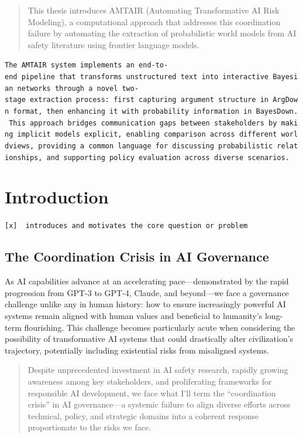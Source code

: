 \documentclass[
  11pt,
  letterpaper,
]{book}
\begin{document}
\begin{quote}
This thesis introduces AMTAIR (Automating Transformative AI Risk
Modeling), a computational approach that addresses this coordination
failure by automating the extraction of probabilistic world models from
AI safety literature using frontier language models.
\end{quote}

\texttt{The\ AMTAIR\ system\ implements\ an\ end-to-end\ pipeline\ that\ transforms\ unstructured\ text\ into\ interactive\ Bayesian\ networks\ through\ a\ novel\ two-stage\ extraction\ process:\ first\ capturing\ argument\ structure\ in\ ArgDown\ format,\ then\ enhancing\ it\ with\ probability\ information\ in\ BayesDown.\ This\ approach\ bridges\ communication\ gaps\ between\ stakeholders\ by\ making\ implicit\ models\ explicit,\ enabling\ comparison\ across\ different\ worldviews,\ providing\ a\ common\ language\ for\ discussing\ probabilistic\ relationships,\ and\ supporting\ policy\ evaluation\ across\ diverse\ scenarios.}


\chapter{Introduction}\label{sec-introduction}

\texttt{{[}x{]}\ \ introduces\ and\ motivates\ the\ core\ question\ or\ problem}

\section{The Coordination Crisis in AI
Governance}\label{sec-coordination-crisis}

As AI capabilities advance at an accelerating pace---demonstrated by the
rapid progression from GPT-3 to GPT-4, Claude, and beyond---we face a
governance challenge unlike any in human history: how to ensure
increasingly powerful AI systems remain aligned with human values and
beneficial to humanity's long-term flourishing. This challenge becomes
particularly acute when considering the possibility of transformative AI
systems that could drastically alter civilization's trajectory,
potentially including existential risks from misaligned systems.

\begin{quote}
Despite unprecedented investment in AI safety research, rapidly growing
awareness among key stakeholders, and proliferating frameworks for
responsible AI development, we face what I'll term the ``coordination
crisis'' in AI governance---a systemic failure to align diverse efforts
across technical, policy, and strategic domains into a coherent response
proportionate to the risks we face.
\end{quote}
\end{document}
